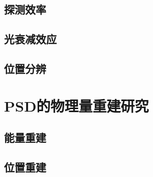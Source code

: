 \subsection{探测效率}
\subsection{光衰减效应}
\subsection{位置分辨}

\section{PSD的物理量重建研究}
\subsection{能量重建}
\subsection{位置重建}